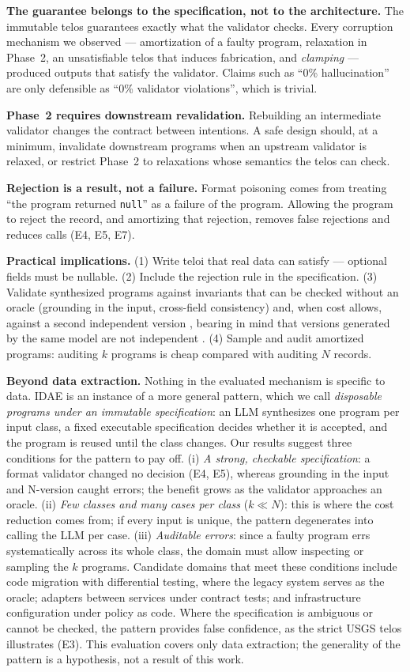 \documentclass[sigconf,nonacm]{acmart}
\begin{document}
\textbf{The guarantee belongs to the specification, not to the architecture.} The immutable telos guarantees exactly what the validator checks. Every corruption mechanism we observed --- amortization of a faulty program, relaxation in Phase~2, an unsatisfiable telos that induces fabrication, and \textit{clamping} --- produced outputs that satisfy the validator. Claims such as ``0\% hallucination'' are only defensible as ``0\% validator violations'', which is trivial.

\textbf{Phase~2 requires downstream revalidation.} Rebuilding an intermediate validator changes the contract between intentions. A safe design should, at a minimum, invalidate downstream programs when an upstream validator is relaxed, or restrict Phase~2 to relaxations whose semantics the telos can check.

\textbf{Rejection is a result, not a failure.} Format poisoning comes from treating ``the program returned \texttt{null}'' as a failure of the program. Allowing the program to reject the record, and amortizing that rejection, removes false rejections and reduces calls (E4, E5, E7).

\textbf{Practical implications.} (1) Write teloi that real data can satisfy --- optional fields must be nullable. (2) Include the rejection rule in the specification. (3) Validate synthesized programs against invariants that can be checked without an oracle (grounding in the input, cross-field consistency) and, when cost allows, against a second independent version \cite{avizienis1985nversion}, bearing in mind that versions generated by the same model are not independent \cite{knight1986experimental}. (4) Sample and audit amortized programs: auditing $k$ programs is cheap compared with auditing $N$ records.

\textbf{Beyond data extraction.} Nothing in the evaluated mechanism is specific to data. IDAE is an instance of a more general pattern, which we call \textit{disposable programs under an immutable specification}: an LLM synthesizes one program per input class, a fixed executable specification decides whether it is accepted, and the program is reused until the class changes. Our results suggest three conditions for the pattern to pay off. (i) \textit{A strong, checkable specification}: a format validator changed no decision (E4, E5), whereas grounding in the input and N-version caught errors; the benefit grows as the validator approaches an oracle. (ii) \textit{Few classes and many cases per class} ($k \ll N$): this is where the cost reduction comes from; if every input is unique, the pattern degenerates into calling the LLM per case. (iii) \textit{Auditable errors}: since a faulty program errs systematically across its whole class, the domain must allow inspecting or sampling the $k$ programs. Candidate domains that meet these conditions include code migration with differential testing, where the legacy system serves as the oracle; adapters between services under contract tests; and infrastructure configuration under policy as code. Where the specification is ambiguous or cannot be checked, the pattern provides false confidence, as the strict USGS telos illustrates (E3). This evaluation covers only data extraction; the generality of the pattern is a hypothesis, not a result of this work.
\end{document}
